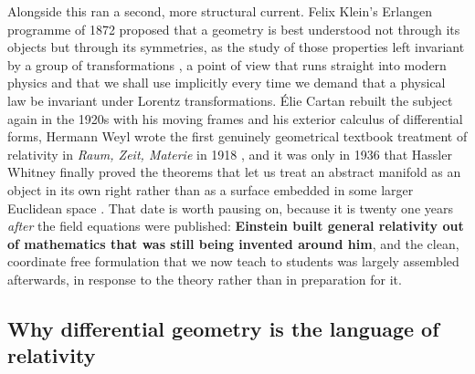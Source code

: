         Alongside this ran a second, more structural current. Felix Klein's Erlangen programme of 1872 proposed that a geometry is best understood not through its objects but through its symmetries, as the study of those properties left invariant by a group of transformations \citep{klein1872}, a point of view that runs straight into modern physics and that we shall use implicitly every time we demand that a physical law be invariant under Lorentz transformations. Élie Cartan rebuilt the subject again in the 1920s with his moving frames and his exterior calculus of differential forms, Hermann Weyl wrote the first genuinely geometrical textbook treatment of relativity in \textit{Raum, Zeit, Materie} in 1918 \citep{weyl1918}, and it was only in 1936 that Hassler Whitney finally proved the theorems that let us treat an abstract manifold as an object in its own right rather than as a surface embedded in some larger Euclidean space \citep{whitney1936}. That date is worth pausing on, because it is twenty one years \textit{after} the field equations were published: \textbf{Einstein built general relativity out of mathematics that was still being invented around him}, and the clean, coordinate free formulation that we now teach to students was largely assembled afterwards, in response to the theory rather than in preparation for it.

    \subsection{Why differential geometry is the language of relativity}


